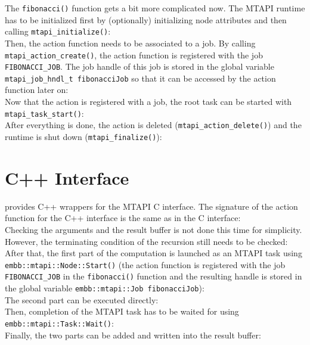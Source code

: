 The \lstinline|fibonacci()| function gets a bit more complicated now. The MTAPI runtime has to be initialized first by (optionally) initializing node attributes and then calling \lstinline|mtapi_initialize()|:
%
\\
%
Then, the action function needs to be associated to a job. By calling \lstinline|mtapi_action_create()|, the action function is registered with the job \lstinline|FIBONACCI_JOB|. The job handle of this job is stored in the global variable \lstinline|mtapi_job_hndl_t fibonacciJob| so that it can be accessed by the action function later on:
%
\\
%
Now that the action is registered with a job, the root task can be started with \lstinline|mtapi_task_start()|:
%
\\
%
After everything is done, the action is deleted (\lstinline|mtapi_action_delete()|) and the runtime is shut down (\lstinline|mtapi_finalize()|):
%
\\
%

\section{C++ Interface}
\label{sec:mtapi_cpp_interface}

\embb provides C++ wrappers for the MTAPI C interface. The signature of the action function for the C++ interface is the same as in the C interface:
%
\\
%
Checking the arguments and the result buffer is not done this time for simplicity. However, the terminating condition of the recursion still needs to be checked:
%
\\
%
After that, the first part of the computation is launched as an MTAPI task using \lstinline|embb::mtapi::Node::Start()| (the action function is registered with the job \lstinline|FIBONACCI_JOB| in the \lstinline|fibonacci()| function and the resulting handle is stored in the global variable \lstinline|embb::mtapi::Job fibonacciJob|):
%
\\
%
The second part can be executed directly:
%
\\
%
Then, completion of the MTAPI task has to be waited for using \lstinline|embb::mtapi::Task::Wait()|:
%
\\
%
Finally, the two parts can be added and written into the result buffer:
%
\\
% 

